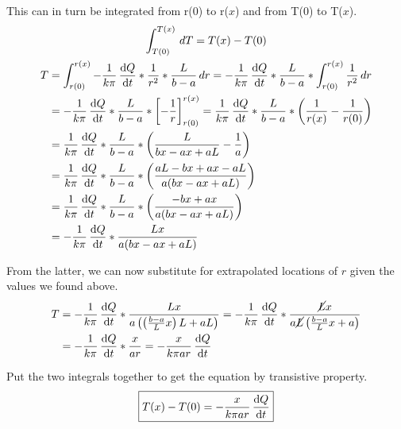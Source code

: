 \documentclass[12pt]{article}
\begin{document}
            This can in turn be integrated from r(0) to r($x$) and from T(0) to T($x$).
            \begin{gather}
                \int_{T(0)}^{T(x)}\,dT  =   T(x) - T(0)\\
                \begin{align}
                    T   &=  \int_{r(0)}^{r(x)} -\frac{1}{k \pi}\,\dv{Q}{t} * \frac{1}{r^2} * \frac{L}{b - a}\,dr
                        =   -\frac{1}{k \pi}\,\dv{Q}{t} * \frac{L}{b - a} * \int_{r(0)}^{r(x)} \frac{1}{r^2}\,dr\\
                        &=  -\frac{1}{k \pi}\,\dv{Q}{t} * \frac{L}{b - a} * \left[ -\frac{1}{r} \right]_{r(0)}^{r(x)}
                        =   \frac{1}{k \pi}\,\dv{Q}{t} * \frac{L}{b - a} * \left( \frac{1}{r(x)} - \frac{1}{r(0)} \right)\\
                        &=  \frac{1}{k \pi}\,\dv{Q}{t} * \frac{L}{b - a} * \left( \frac{L}{bx - ax + aL} - \frac{1}{a} \right)\\
                        &=  \frac{1}{k \pi}\,\dv{Q}{t} * \frac{L}{b - a} * \left( \frac{aL - bx + ax - aL}{a(bx - ax + aL)} \right)\\
                        &=  \frac{1}{k \pi}\,\dv{Q}{t} * \frac{L}{b - a} * \left( \frac{-bx + ax}{a(bx - ax + aL)} \right)\\
                        &=  -\frac{1}{k \pi}\,\dv{Q}{t} * \frac{Lx}{a(bx - ax + aL)}
                \end{align}
            \end{gather}

            From the latter, we can now substitute for extrapolated locations of $r$ given the values we found above. 
            \begin{align}
                T   &=  -\frac{1}{k \pi}\,\dv{Q}{t} * \frac{Lx}{a\left( \left( \frac{b - a}{L}x \right)L + aL \right)}
                    =   -\frac{1}{k \pi}\,\dv{Q}{t} * \frac{\cancel{L}x}{a\cancel{L}\left( \frac{b - a}{L}x + a \right)}\\
                    &=  -\frac{1}{k \pi}\,\dv{Q}{t} * \frac{x}{ar}
                    =   -\frac{x}{k \pi ar}\,\dv{Q}{t}
            \end{align}

            Put the two integrals together to get the equation by transistive property.
            \begin{equation}
                \boxed{T(x) - T(0)  =   -\frac{x}{k \pi ar}\,\dv{Q}{t}}
            \end{equation}
\end{document}
